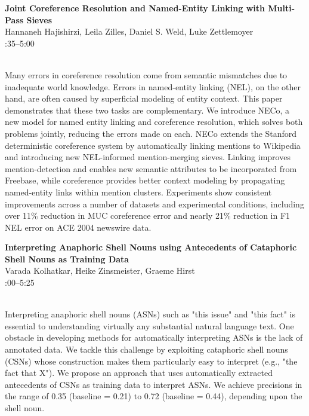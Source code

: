 \documentclass[twoside,makeidx]{book}
\renewcommand{\normalsize}{\fontsize{8}{9}\selectfont}
\renewcommand{\small}{\fontsize{7}{8}\selectfont}
\begin{document}
\par\vspace{2em}\noindent%
\begin{minipage}{\linewidth}%
\begin{center}
\textbf{\normalsize Joint Coreference Resolution and Named-Entity Linking with Multi-Pass Sieves}\\
\normalsize  Hannaneh Hajishirzi,  Leila Zilles,  Daniel S. Weld,  Luke Zettlemoyer\\
{\small 4:35--5:00}\\
\end{center}
\end{minipage}\\[0.5em]
\nopagebreak%
\noindent%
{\small Many errors in coreference resolution come from semantic mismatches due to inadequate world knowledge. Errors in named-entity linking (NEL), on the other hand, are often caused by superficial modeling of entity context. This paper demonstrates that these two tasks are complementary. We introduce NECo, a new model for named entity linking and coreference resolution, which solves both problems jointly, reducing the errors made on each. NECo extends the Stanford deterministic coreference system by automatically linking mentions to Wikipedia and introducing new NEL-informed mention-merging sieves. Linking improves mention-detection and enables new semantic attributes to be incorporated from Freebase, while coreference provides better context modeling by propagating named-entity links within mention clusters. Experiments show consistent improvements across a number of datasets and experimental conditions, including over 11\% reduction in MUC coreference error and nearly 21\% reduction in F1 NEL error on ACE 2004 newswire data.}
\par\vspace{2em}\noindent%
\begin{minipage}{\linewidth}%
\begin{center}
\textbf{\normalsize Interpreting Anaphoric Shell Nouns using Antecedents of Cataphoric Shell Nouns as Training Data}\\
\normalsize  Varada Kolhatkar,  Heike Zinsmeister,  Graeme Hirst\\
{\small 5:00--5:25}\\
\end{center}
\end{minipage}\\[0.5em]
\nopagebreak%
\noindent%
{\small Interpreting anaphoric shell nouns (ASNs) such as "this issue" and "this fact" is essential to understanding virtually any substantial natural language text. One obstacle in developing methods for automatically interpreting ASNs is the lack of annotated data. We tackle this challenge by exploiting cataphoric shell nouns (CSNs) whose construction makes them particularly easy to interpret (e.g., "the fact that X"). We propose an approach that uses automatically extracted antecedents of CSNs as training data to interpret ASNs. We achieve precisions in the range of 0.35 (baseline = 0.21) to 0.72 (baseline = 0.44), depending upon the shell noun.}
\clearpage
\end{document}
